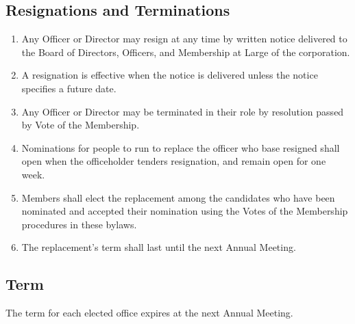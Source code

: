 \documentclass{article}
\begin{document}
\subsection{Resignations and Terminations}
\begin{enumerate}
\item Any Officer or Director may resign at any time by written notice delivered to the 
Board of Directors, Officers, and Membership at Large of the corporation.
\item A resignation is effective when the notice is delivered unless the notice specifies a 
future date.
\item Any Officer or Director may be terminated in their role by resolution passed by Vote 
of the Membership.
\item Nominations for people to run to replace the officer who base resigned shall open 
when the officeholder tenders resignation, and remain open for one week.
\item Members shall elect the replacement among the candidates who have been 
nominated and accepted their nomination using the Votes of the Membership procedures 
in these bylaws.
\item The replacement's term shall last until the next Annual Meeting.
\end{enumerate}
\subsection{Term}
The term for each elected office expires at the next Annual Meeting.
\end{document}
